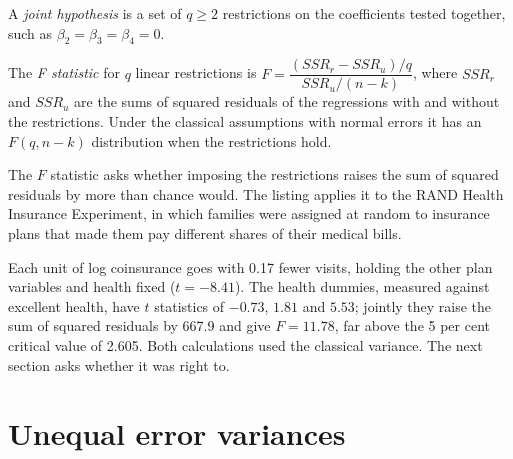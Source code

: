 \begin{definition}\label{def:b2:regression-inference:joint-hypothesis}
A \emph{joint hypothesis} is a set of $q \geq 2$ restrictions on the coefficients tested together,
such as $\beta_2 = \beta_3 = \beta_4 = 0$.
\end{definition}

\begin{definition}[F statistic]\label{def:b2:regression-inference:f-statistic}
The \emph{F statistic} for $q$ linear restrictions is $F = \dfrac{(\mathit{SSR}_r -
\mathit{SSR}_u)/q}{\mathit{SSR}_u/(n - k)}$, where $\mathit{SSR}_r$ and $\mathit{SSR}_u$ are the sums of squared residuals of the
regressions with and without the restrictions. Under the classical assumptions with normal errors it has an $F(q, n - k)$
distribution when the restrictions hold.
\end{definition}

The $F$ statistic asks whether imposing the restrictions raises the sum of squared residuals by more than chance would. The
listing applies it to the RAND Health Insurance Experiment, in which families were assigned at random to insurance plans
that made them pay different shares of their medical bills.

\label{lst:b2:regression-inference:tf}

\label{out:b2:regression-inference:tf}

Each unit of log coinsurance goes with 0.17 fewer visits, holding the other plan variables and health fixed ($t = -8.41$).
The health dummies, measured against excellent health, have $t$ statistics of $-0.73$, $1.81$ and $5.53$; jointly they
raise the sum of squared residuals by 667.9 and give $F = 11.78$, far above the 5 per cent critical value of 2.605. Both
calculations used the classical variance. The next section asks whether it was right to.

\section{Unequal error variances}\label{sec:b2:regression-inference:robust}

